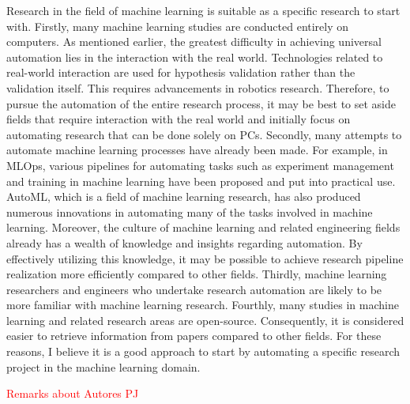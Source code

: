 \documentclass{book}
\begin{document}
Research in the field of machine learning is suitable as a specific research to start with. Firstly, many machine learning studies are conducted entirely on computers. As mentioned earlier, the greatest difficulty in achieving universal automation lies in the interaction with the real world. Technologies related to real-world interaction are used for hypothesis validation rather than the validation itself. This requires advancements in robotics research. Therefore, to pursue the automation of the entire research process, it may be best to set aside fields that require interaction with the real world and initially focus on automating research that can be done solely on PCs. Secondly, many attempts to automate machine learning processes have already been made. For example, in MLOps, various pipelines for automating tasks such as experiment management and training in machine learning have been proposed and put into practical use. AutoML, which is a field of machine learning research, has also produced numerous innovations in automating many of the tasks involved in machine learning. Moreover, the culture of machine learning and related engineering fields already has a wealth of knowledge and insights regarding automation. By effectively utilizing this knowledge, it may be possible to achieve research pipeline realization more efficiently compared to other fields. Thirdly, machine learning researchers and engineers who undertake research automation are likely to be more familiar with machine learning research. Fourthly, many studies in machine learning and related research areas are open-source. Consequently, it is considered easier to retrieve information from papers compared to other fields. For these reasons, I believe it is a good approach to start by automating a specific research project in the machine learning domain.

\textcolor{red}{Remarks about Autores PJ}


\end{document}
